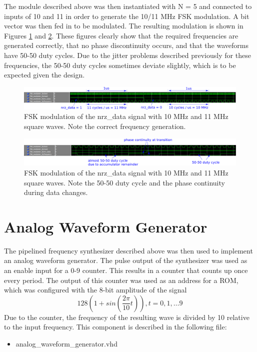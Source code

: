 \documentclass[a4paper, 10pt, titlepage]{article}
\begin{document}
The module described above was then instantiated with N = 5 and connected to inputs of 10 and 11 in order to generate the 10/11 MHz FSK modulation. A bit vector was then fed in to be modulated. The resulting modulation is shown in Figures \ref{fig:fsk_1} and \ref{fig:fsk_2}. These figures clearly show that the required frequencies are generated correctly, that no phase discontinuity occurs, and that the waveforms have 50-50 duty cycles. Due to the jitter problems described previously for these frequencies, the 50-50 duty cycles sometimes deviate slightly, which is to be expected given the design.

\begin{figure}[!htb]
    \centering
    \includegraphics[width=\linewidth]{fsk_10_11_MHz.PNG}
    \caption{FSK modulation of the nrz\_data signal with 10 MHz and 11 MHz square waves. Note the correct frequency generation.}
    \label{fig:fsk_1}
\end{figure}
\begin{figure}[!htb]
    \centering
    \includegraphics[width=\linewidth]{fsk_50-50_phase.PNG}
    \caption{FSK modulation of the nrz\_data signal with 10 MHz and 11 MHz square waves. Note the 50-50 duty cycle and the phase continuity during data changes.}
    \label{fig:fsk_2}
\end{figure}

\section{Analog Waveform Generator}

The pipelined frequency synthesizer described above was then used to implement an analog waveform generator. The pulse output of the synthesizer was used as an enable input for a 0-9 counter. This results in a counter that counts up once every period. The output of this counter was used as an address for a ROM, which was configured with the 8-bit amplitude of the signal
\[ 128 (1 + sin(\frac{2 \pi}{10} t)), t = 0, 1, \ldots 9 \]
Due to the counter, the frequency of the resulting wave is divided by 10 relative to the input frequency. This component is described in the following file:
\begin{itemize}
    \item analog\_waveform\_generator.vhd
\end{itemize}
\end{document}

